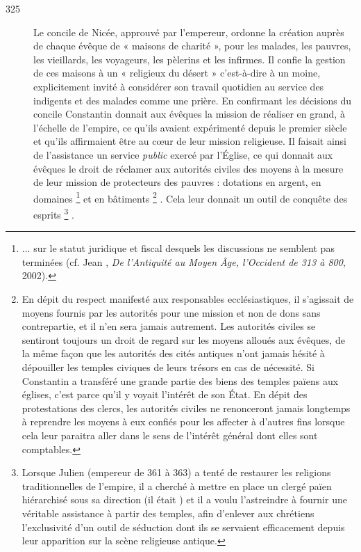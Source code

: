 \begin{description}
\item[325] Le concile de Nicée, approuvé par l'empereur, ordonne la création auprès de chaque évêque de « maisons de charité », pour les malades, les pauvres, les vieillards, les voyageurs, les pèlerins et les infirmes. Il confie la gestion de ces maisons à un « religieux du désert » c'est-à-dire à un moine, explicitement invité à considérer son travail quotidien au service des indigents et des malades comme une prière. En confirmant les décisions du concile Constantin donnait aux évêques la mission de réaliser en grand, à l'échelle de l'empire, ce qu'ils avaient expérimenté depuis le premier siècle et qu'ils affirmaient être au cœur de leur mission religieuse. Il faisait ainsi de l'assistance un service \emph{public} exercé par l'Église, ce qui donnait aux évêques le droit de réclamer aux autorités civiles des moyens à la mesure de leur mission de protecteurs des pauvres : dotations en argent, en domaines%
\footnote{... sur le statut juridique et fiscal desquels les discussions ne semblent pas terminées (cf. Jean , \emph{De l'Antiquité au Moyen Âge, l'Occident de 313 à 800}, 2002).} 
et en bâtiments%
\footnote{En dépit du respect manifesté aux responsables ecclésiastiques, il s'agissait de moyens fournis par les autorités pour une mission et non de dons sans contrepartie, et il n'en sera jamais autrement. Les autorités civiles se sentiront toujours un droit de regard sur les moyens alloués aux évêques, de la même façon que les autorités des cités antiques n'ont jamais hésité à dépouiller les temples civiques de leurs trésors en cas de nécessité. Si Constantin a transféré une grande partie des biens des temples païens aux églises, c'est parce qu'il y voyait l'intérêt de son État. En dépit des protestations des clercs, les autorités civiles ne renonceront jamais longtemps à reprendre les moyens à eux confiés pour les affecter à d'autres fins lorsque cela leur paraitra aller dans le sens de l'intérêt général dont elles sont comptables.}%
. Cela leur donnait un outil de conquête des esprits%
\footnote{Lorsque Julien (empereur de 361 à 363) a tenté de restaurer les religions traditionnelles de l'empire, il a cherché à mettre en place un clergé païen hiérarchisé sous sa direction (il était ) et il a voulu l'astreindre à fournir une véritable assistance à partir des temples, afin d'enlever aux chrétiens l'exclusivité d'un outil de séduction dont ils se servaient efficacement depuis leur apparition sur la scène religieuse antique.}%
. 


\end{description}
